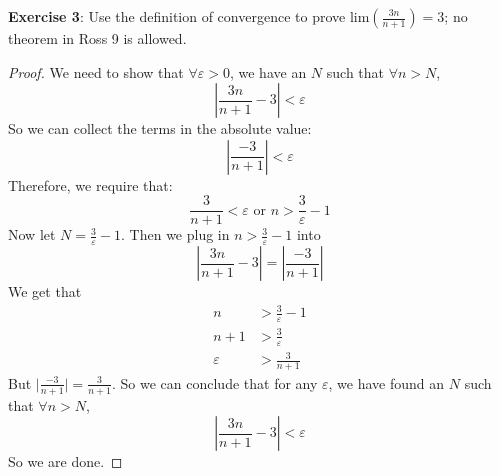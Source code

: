 \documentclass{article}
\begin{document}
\textbf{Exercise 3}: Use the definition of convergence to prove $\text{lim}(\frac{3n}{n + 1}) = 3$; no theorem in Ross 9 is allowed.
    \begin{proof}
        We need to show that $\forall \varepsilon >  0$, we have an $N$ such that $\forall n > N$,
            \begin{equation*}
                \left\lvert \dfrac{3n}{n + 1} - 3 \right\rvert < \varepsilon
            \end{equation*}
        So we can collect the terms in the absolute value:
            \begin{equation*}
                \left\lvert \dfrac{-3}{n + 1} \right\rvert < \varepsilon
            \end{equation*}
        Therefore, we require that:
            \begin{equation*}
                \dfrac{3}{n + 1} < \varepsilon \text{ or } n > \dfrac{3}{\varepsilon} - 1
            \end{equation*}
        Now let $N = \frac{3}{\varepsilon} - 1$. Then we plug in $n > \frac{3}{\varepsilon} - 1$ into
            \begin{equation*}
                \left\lvert \dfrac{3n}{n + 1} - 3 \right\rvert = \left\lvert \dfrac{-3}{n + 1} \right\rvert
            \end{equation*}
        We get that 
            \begin{align*}
                n &> \frac{3}{\varepsilon} - 1 \\
                n + 1 &> \frac{3}{\varepsilon} \\
                \varepsilon &> \frac{3}{n + 1}
            \end{align*}
        But $\lvert \frac{-3}{n + 1} \rvert = \frac{3}{n + 1}$. So we can conclude that for any $\varepsilon$, we have found an $N$ such that $\forall n > N$,
            \begin{equation*}
                \left\lvert \dfrac{3n}{n + 1} - 3 \right\rvert < \varepsilon
            \end{equation*}
        So we are done.
    \end{proof}
\end{document}
